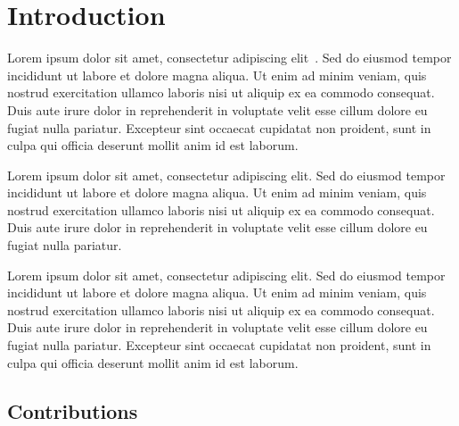 \section{Introduction}\label{sec:introduction}


Lorem ipsum dolor sit amet, consectetur adipiscing elit~\citep{example2025}.
Sed do eiusmod tempor incididunt ut labore et dolore magna aliqua. Ut enim ad
minim veniam, quis nostrud exercitation ullamco laboris nisi ut aliquip ex ea
commodo consequat. Duis aute irure dolor in reprehenderit in voluptate velit
esse cillum dolore eu fugiat nulla pariatur. Excepteur sint occaecat cupidatat
non proident, sunt in
culpa qui officia deserunt mollit anim id est laborum.

Lorem ipsum dolor sit amet, consectetur adipiscing elit. Sed do eiusmod tempor
incididunt ut labore et dolore magna aliqua. Ut enim ad minim veniam, quis
nostrud exercitation ullamco laboris nisi ut aliquip ex ea commodo consequat.
Duis aute irure dolor in reprehenderit in voluptate velit esse cillum dolore eu
fugiat nulla pariatur.

Lorem ipsum dolor sit amet, consectetur adipiscing elit. Sed do eiusmod tempor
incididunt ut labore et dolore magna aliqua. Ut enim ad minim veniam, quis
nostrud exercitation ullamco laboris nisi ut aliquip ex ea commodo consequat.
Duis aute irure dolor in reprehenderit in voluptate velit esse cillum dolore eu
fugiat nulla pariatur. Excepteur sint occaecat cupidatat non proident, sunt in
culpa qui officia deserunt mollit anim id est laborum.

\subsection{Contributions}\label{ssec:contributions}

